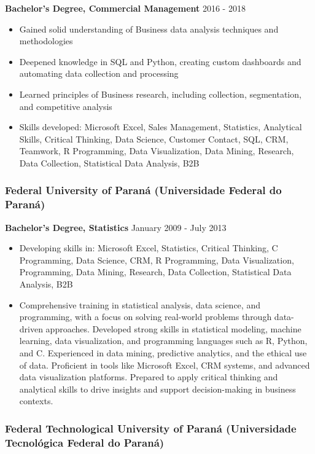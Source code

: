 \documentclass[
]{article}
\providecommand{\tightlist}{%
  \setlength{\itemsep}{0pt}\setlength{\parskip}{0pt}}
\begin{document}
\textbf{Bachelor's Degree, Commercial Management} \textbar{} 2016 - 2018

\begin{itemize}
\tightlist
\item
  Gained solid understanding of Business data analysis techniques and
  methodologies
\item
  Deepened knowledge in SQL and Python, creating custom dashboards and
  automating data collection and processing
\item
  Learned principles of Business research, including collection,
  segmentation, and competitive analysis
\item
  Skills developed: Microsoft Excel, Sales Management, Statistics,
  Analytical Skills, Critical Thinking, Data Science, Customer Contact,
  SQL, CRM, Teamwork, R Programming, Data Visualization, Data Mining,
  Research, Data Collection, Statistical Data Analysis, B2B
\end{itemize}

\subsubsection{Federal University of Paraná (Universidade Federal do
Paraná)}\label{federal-university-of-paranuxe1-universidade-federal-do-paranuxe1}

\textbf{Bachelor's Degree, Statistics} \textbar{} January 2009 - July
2013

\begin{itemize}
\item
  Developing skills in: Microsoft Excel, Statistics, Critical Thinking,
  C Programming, Data Science, CRM, R Programming, Data Visualization,
  Programming, Data Mining, Research, Data Collection, Statistical Data
  Analysis, B2B
\item
  Comprehensive training in statistical analysis, data science, and
  programming, with a focus on solving real-world problems through
  data-driven approaches. Developed strong skills in statistical
  modeling, machine learning, data visualization, and programming
  languages such as R, Python, and C. Experienced in data mining,
  predictive analytics, and the ethical use of data. Proficient in tools
  like Microsoft Excel, CRM systems, and advanced data visualization
  platforms. Prepared to apply critical thinking and analytical skills
  to drive insights and support decision-making in business contexts.
\end{itemize}

\subsubsection{Federal Technological University of Paraná (Universidade
Tecnológica Federal do
Paraná)}\label{federal-technological-university-of-paranuxe1-universidade-tecnoluxf3gica-federal-do-paranuxe1}
\end{document}
